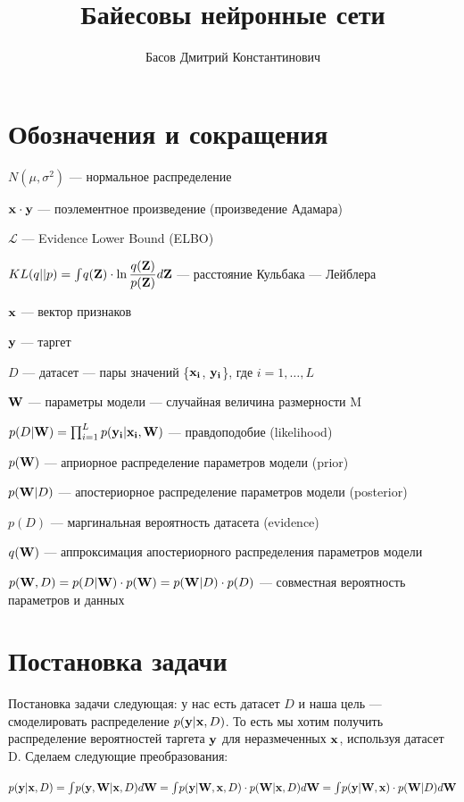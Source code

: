 \documentclass{article}
\title{Байесовы нейронные сети}
\author{Басов Дмитрий Константинович}
\date{}
\begin{document}
\maketitle

\section{Обозначения и сокращения}
$N(\mu, \sigma^2)$ — нормальное распределение

$\bold{x} \cdot \bold{y}$ — поэлементное произведение (произведение Адамара)

$\mathcal{L}$ — Evidence Lower Bound (ELBO)

$KL(q || p) = \int_{}{} q(\bold{Z}) \cdot \ln{\dfrac{q(\bold{Z})}{p(\bold{Z})}} d\bold{Z}$ — расстояние Кульбака — Лейблера

$\bold{x}$ — вектор признаков

$\bold{y}$ — таргет

$D$ — датасет — пары значений \{$\bold{x_i}$, $\bold{y_i}$\}, где $i = 1, \dots, L$

$\bold{W}$ — параметры модели — случайная величина размерности M

$p(D | \bold{W}) = \prod_{i=1}^{L} p(\bold{y_i} | \bold{x_i}, \bold{W})$ — правдоподобие (likelihood)

$p(\bold{W})$ — априорное распределение параметров модели (prior)

$p(\bold{W}| D)$ — апостериорное распределение параметров модели (posterior)

$p(D)$ — маргинальная вероятность датасета (evidence)

$q(\bold{W})$ — аппроксимация апостериорного распределения параметров модели

$p(\bold{W}, D) =
p(D | \bold{W}) \cdot p(\bold{W}) =
p(\bold{W}| D)\cdot p(D)$
— совместная вероятность параметров и данных

\section{Постановка задачи}
Постановка задачи следующая: у нас есть датасет $D$ и наша цель — смоделировать распределение $p(\bold{y} | \bold{x}, D)$. То есть мы хотим получить распределение вероятностей таргета $\bold{y}$ для неразмеченных $\bold{x}$, используя датасет D. Сделаем следующие преобразования:

$p(\bold{y} | \bold{x}, D) =
\int_{}{} p(\bold{y}, \bold{W} | \bold{x}, D) d\bold{W} =
\int_{}{} p(\bold{y} | \bold{W}, \bold{x}, D) \cdot p(\bold{W} | \bold{x}, D) d\bold{W} = 
\int_{}{} p(\bold{y} | \bold{W}, \bold{x}) \cdot p(\bold{W} | D) d\bold{W}$
\end{document}
